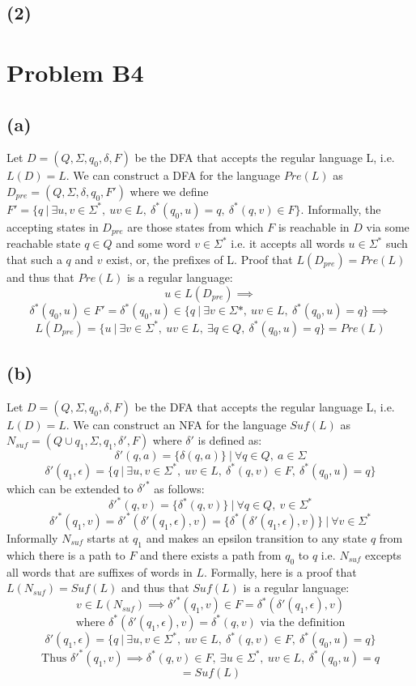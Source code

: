 \documentclass[12pt]{article}
\begin{document}
\subsection*{(2)}

\section*{Problem B4}
\subsection*{(a)}
  Let $D = (Q, \Sigma, q_0, \delta, F)$ be the DFA that accepts the regular
  language L, i.e. $L(D) = L$. We can construct a DFA for the language
  $Pre(L)$ as $D_{pre} = (Q, \Sigma, \delta, q_0, F')$ where we define
  $F' = \{q \:|\: \exists u,v \in \Sigma^* ,\: uv \in L
  ,\: \delta^* (q_0, u) = q ,\: \delta^* (q, v) \in F\}$.
  Informally, the accepting states in $D_{pre}$ are those states from which
  $F$ is reachable in $D$ via some reachable state $q \in Q$ and some
  word $v \in \Sigma^*$ i.e. it accepts all words $u \in \Sigma^*$
  such that such a $q$ and $v$ exist, or, the prefixes of L.
  Proof that $L(D_{pre}) = Pre(L)$ and thus that $Pre(L)$ is a regular language:
  $$u \in L(D_{pre}) \implies$$ $$\delta^*(q_0, u) \in F' =
  \delta^*(q_0, u) \in \{q \:|\: \exists v \in \Sigma* ,\: uv \in L
  ,\: \delta^*(q_0, u) = q\} \implies$$
  $$L(D_{pre}) = \{u \:|\: \exists v \in \Sigma^* ,\: uv \in L ,\:
  \exists q \in Q ,\: \delta^*(q_0, u) = q \}
  = Pre(L)$$
 
\subsection*{(b)}
  Let $D = (Q, \Sigma, q_0, \delta, F)$ be the DFA that accepts the regular
  language L, i.e. $L(D) = L$. We can construct an NFA for the language
  $Suf(L)$ as $N_{suf} = (Q\cup{q_1}, \Sigma, q_1, \delta{'}, F)$
  where $\delta{'}$ is defined as:
  $$\delta{'}(q, a) = \{\delta(q,a)\} \:|\: \forall q \in Q ,\: a \in \Sigma$$
  $$\delta{'}(q_1, \epsilon) = \{q \:|\: \exists u,v \in \Sigma^* ,\:
  uv \in L ,\: \delta^* (q,v) \in F ,\: \delta^* (q_0,u) = q\}$$
  which can be extended to $\delta{'}^*$ as follows:
  $$\delta{'}^*(q, v) = \{\delta^*(q,v)\} \:|\:
  \forall q \in Q ,\: v \in \Sigma^*$$
  $$\delta{'}^*(q_1, v) = \delta{'}^*(\delta{'}(q_1, \epsilon), v) =
  \{\delta^*(\delta{'}(q_1, \epsilon), v)\} \:|\: \forall v \in \Sigma^*$$
  Informally $N_{suf}$ starts at $q_1$ and makes
  an epsilon transition to any state $q$ from which there is a path to $F$ and
  there exists a path from $q_0$ to $q$ i.e. $N_{suf}$ excepts all words that
  are suffixes of words in $L$. Formally, here is a proof that
  $L(N_{suf}) = Suf(L)$ and thus that $Suf(L)$ is a regular language:
  $$ v \in L(N_{suf}) \implies \delta{'}^*(q_1, v) \in F =
  \delta^*(\delta{'}(q_1, \epsilon), v) $$
  $$\text{where }\delta^*(\delta{'}(q_1, \epsilon), v) = \delta^*(q, v)
  \text{ via the definition}$$
  $$\delta{'}(q_1, \epsilon) = \{q \:|\: \exists u,v \in \Sigma^* ,\:
  uv \in L ,\: \delta^* (q,v) \in F ,\: \delta^* (q_0,u) = q\}$$
  $$\text{Thus }\delta{'}^* (q_1,v) \implies
  \delta^* (q,v) \in F ,\: \exists u \in \Sigma^* ,\: uv \in L ,\:
  \delta^* (q_0,u) = q$$
  $$ = Suf(L)$$
\end{document}

